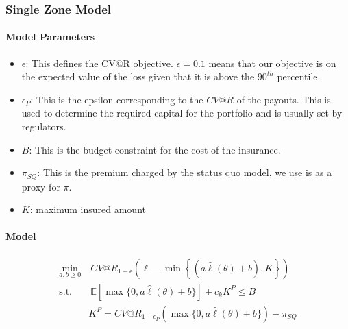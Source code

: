 \documentclass[11pt]{article}
\begin{document}

    \subsubsection*{Single Zone Model}
    \paragraph*{Model Parameters}
    \begin{itemize}
        \item $\epsilon$: This defines the CV@R objective. $\epsilon = 0.1$ means that our objective is on the expected value of the loss given that it is above the $90^{th}$ percentile. 
        \item $\epsilon_P$: This is the epsilon corresponding to the $CV@R$ of the payouts. This is used to determine the required capital for the portfolio and is usually set by regulators.
        \item $B$: This is the budget constraint for the cost of the insurance.
        \item $\pi_{SQ}$: This is the premium charged by the status quo model, we use is as a proxy for $\pi$. 
        \item $K$: maximum insured amount
    \end{itemize}

    \paragraph*{Model}
    \begin{align}
        \min_{a,b\geq 0} &\ CV@R_{1-\epsilon}\left(\ell  - \min \left \{(a \hat{\ell}(\theta) + b), K \right \} \right)\\
        \text{s.t.   } &\   \mathbb{E} \left[ \max \{0,a \hat{\ell}(\theta) +b \} \right] +c_k K^P \leq B\\
        & K^P = CV@R_{1-\epsilon_P} \left( \max \{0,a \hat{\ell}(\theta) +b \} \right) - \pi_{SQ}
    \end{align}
\end{document}
